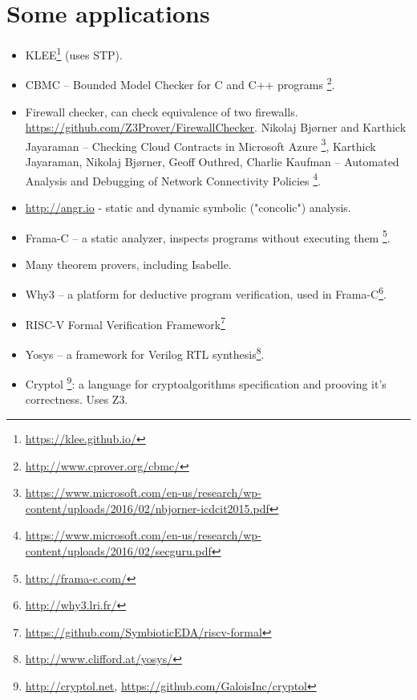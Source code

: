 \chapter{Some applications}

\begin{itemize}

\item KLEE\footnote{\url{https://klee.github.io/}} (uses STP).

\item CBMC -- Bounded Model Checker for C and C++ programs
\footnote{\url{http://www.cprover.org/cbmc/}}.

\item Firewall checker, can check equivalence of two firewalls.
\url{https://github.com/Z3Prover/FirewallChecker}.
Nikolaj Bjørner and Karthick Jayaraman -- Checking Cloud Contracts in Microsoft Azure
\footnote{\url{https://www.microsoft.com/en-us/research/wp-content/uploads/2016/02/nbjorner-icdcit2015.pdf}},
Karthick Jayaraman, Nikolaj Bjørner, Geoff Outhred, Charlie Kaufman -- Automated Analysis and Debugging of Network Connectivity Policies
\footnote{\url{https://www.microsoft.com/en-us/research/wp-content/uploads/2016/02/secguru.pdf}}.

\item \url{http://angr.io} - static and dynamic symbolic ("concolic") analysis.

\item Frama-C -- a static analyzer, inspects programs without executing them
\footnote{\url{http://frama-c.com/}}.

\item Many theorem provers, including Isabelle.

\item Why3 -- a platform for deductive program verification,
used in Frama-C\footnote{\url{http://why3.lri.fr/}}.

\item RISC-V Formal Verification Framework\footnote{\url{https://github.com/SymbioticEDA/riscv-formal}}

\item Yosys -- a framework for Verilog RTL synthesis\footnote{\url{http://www.clifford.at/yosys/}}.

\item Cryptol
\footnote{\url{http://cryptol.net}, \url{https://github.com/GaloisInc/cryptol}}:
a language for cryptoalgorithms specification and prooving it's correctness. Uses Z3.

\end{itemize}
